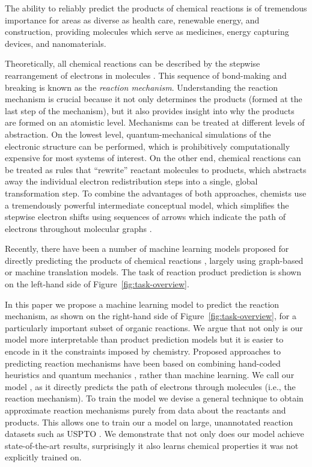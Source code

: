 
The ability to reliably predict the products of chemical reactions is of tremendous importance for areas as diverse as health care, renewable energy, and construction, providing molecules which serve as medicines, energy capturing devices, and nanomaterials. 


Theoretically, all chemical reactions can be described by the stepwise rearrangement of electrons in molecules \cite{herges1994organizing}. 
This sequence of bond-making and breaking is known as the \emph{reaction mechanism}. 
Understanding the reaction mechanism is crucial because it not only determines the products (formed at the last step of the mechanism), 
but it also provides insight into why the products are formed on an atomistic level. 
%
Mechanisms can be treated at different levels of abstraction. 
On the lowest level, quantum-mechanical simulations of the electronic structure can be performed, which is prohibitively computationally expensive for most systems of interest. 
On the other end, chemical reactions can be treated as rules that ``rewrite'' reactant molecules to products, which abstracts away the individual electron redistribution steps into a single, global transformation step. 
To combine the advantages of both approaches, chemists use a tremendously powerful intermediate conceptual model, which simplifies the stepwise electron shifts using sequences of arrows which indicate the path of electrons throughout molecular graphs \cite{herges1994organizing}. 

Recently, there have been a number of machine learning models proposed for directly predicting the products of chemical reactions \cite{coley2017prediction,jin2017predicting,schwaller2017found,neural-symbolic,segler2018planning,wei2016neural}, largely using graph-based or machine translation models. 
The task of reaction product prediction is shown on the left-hand side of Figure~\ref{fig:task-overview}. 

In this paper we propose a machine learning model to predict the reaction mechanism, as shown on the right-hand side of Figure~\ref{fig:task-overview}, for a particularly important subset of organic reactions.
We argue that not only is our model more interpretable than product prediction models but it is easier to encode in it the constraints imposed by chemistry. 
Proposed approaches to predicting reaction mechanisms have been based on combining hand-coded heuristics and quantum mechanics \cite{bergeler2015heuristics,kim2018efficient,nandi2017tabu,rappoport2014complex,simm2017context,zimmerman2013automated}, 
rather than machine learning.
We call our model \ourModel, as it directly predicts the path of electrons through molecules (i.e., the reaction mechanism). 
To train the model we devise a general technique to obtain approximate reaction mechanisms purely from data about the reactants and products. 
This allows one to train our a model on large, unannotated reaction datasets such as USPTO \cite{lowe2012extraction}. We demonstrate that not only does our model achieve state-of-the-art results, surprisingly it also learns chemical properties it was not explicitly trained on.




